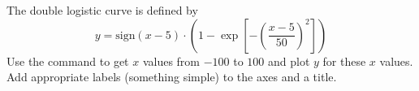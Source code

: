 {The double logistic curve is defined by 
\[
y=\textrm{sign}(x-5)\cdot\left(1-\exp\left[-\left(\frac{x-5}{50}\right)^2\right]\right)
\]
Use the command  to get $x$ values from $-100$ to $100$ and plot $y$ for these $x$ values.  Add appropriate labels (something simple) to the axes and a title.}
{}
